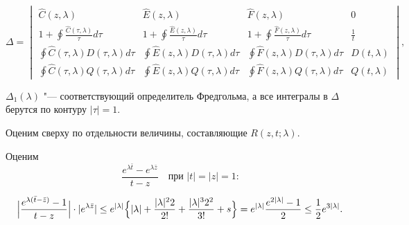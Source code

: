 \begin{equation*}

\Delta=\begin{vmatrix}

\hat C(z,\lambda ) & \hat E(z,\lambda ) & \hat F(z,\lambda ) & 0  \\

\displaystyle 1 + \oint \frac{\hat C(\tau ,\lambda )}{\tau }d\tau &

\displaystyle  1 + \oint \frac{\hat E(z,\lambda )}{\tau }d\tau &

\displaystyle  1 + \oint \frac{\hat F(z,\lambda )}{\tau }d\tau &

\displaystyle  \frac{1}{t}  \\

\displaystyle \oint \hat C(\tau,\lambda)D(\tau,\lambda)d\tau & 

\displaystyle \oint \hat E(z,\lambda)D(\tau,\lambda)d\tau &

\displaystyle  \oint \hat F(z,\lambda)D(\tau,\lambda)d\tau &

D(t,\lambda )\\

\displaystyle \oint {\hat C(\tau,\lambda)Q(\tau,\lambda)d\tau}&

\displaystyle \oint {\hat E(z,\lambda)Q(\tau,\lambda)d\tau} & 

\displaystyle \oint {\hat F(z,\lambda) Q(\tau,\lambda)d\tau}&

Q(t,\lambda)

\end{vmatrix},

\end{equation*}

$\Delta _1 (\lambda )$ "--- соответствующий определитель Фредгольма, а все интегралы в $\Delta$ берутся по контуру $|\tau|=1$.



Оценим сверху по отдельности величины, составляющие $R(z,t;\lambda )$. 

Оценим $$

\frac{e^{\lambda \bar t}  - e^{\lambda \bar z}}{t - z}\quad \text{при $|t| = |z| = 1$:}$$ 

\[

\Bigl| \frac{e^{\lambda (\bar t - \bar z)}  - 1}{t - z} \Bigr| \cdot   | e^{\lambda \bar z} | \le e^{|\lambda |} \Bigl\{ |\lambda | + \frac{|\lambda |^2 2}{2!} + \frac{|\lambda |^3 2^2 }{3!} +   s  \Bigr\} = e^{|\lambda |} \frac{e^{2|\lambda |}  - 1}{2} \le \frac{1}{2}e^{3|\lambda |}.

\]

